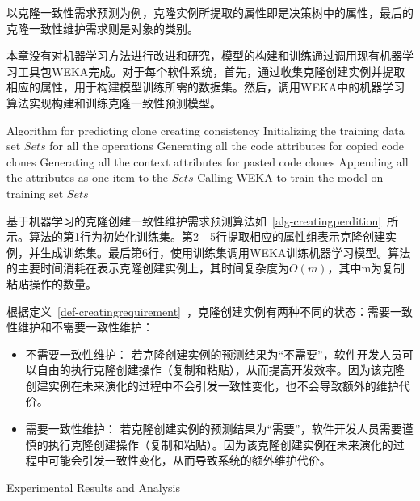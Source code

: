 以克隆一致性需求预测为例，克隆实例所提取的属性即是决策树中的属性，最后的克隆一致性维护需求则是对象的类别。

本章没有对机器学习方法进行改进和研究，模型的构建和训练通过调用现有机器学习工具包WEKA完成。对于每个软件系统，首先，通过收集克隆创建实例并提取相应的属性，用于构建模型训练所需的数据集。然后，调用WEKA中的机器学习算法实现构建和训练克隆一致性预测模型。

\vspace{1em}
\begin{minipage}{0.8\textwidth}
\centering
\begin{algorithm}[H]
 {Algorithm for predicting clone creating consistency}
\label{alg-creatingperdition}
Initializing the training data set $Sets$ for all the operations\; 
{ 
Generating all the code attributes for copied code clones\;
Generating all the context attributes for pasted code clones\;
Appending all the attributes as one item to the $Sets$\;
}
Calling WEKA to train the model on training set $Sets$\;
\end{algorithm}
\end{minipage}
\vspace{1em}

基于机器学习的克隆创建一致性维护需求预测算法如~\ref{alg-creatingperdition}~所示。算法的第1行为初始化训练集。第2 - 5行提取相应的属性组表示克隆创建实例，并生成训练集。最后第6行，使用训练集调用WEKA训练机器学习模型。算法的主要时间消耗在表示克隆创建实例上，其时间复杂度为$O(m)$，其中m为复制粘贴操作的数量。


根据定义~\ref{def-creatingrequirement}~，克隆创建实例有两种不同的状态：需要一致性维护和不需要一致性维护：
\begin{itemize}
\item 
不需要一致性维护：
若克隆创建实例的预测结果为“不需要”，软件开发人员可以自由的执行克隆创建操作（复制和粘贴），从而提高开发效率。因为该克隆创建实例在未来演化的过程中不会引发一致性变化，也不会导致额外的维护代价。
\item
需要一致性维护：
若克隆创建实例的预测结果为“需要”，软件开发人员需要谨慎的执行克隆创建操作（复制和粘贴）。因为该克隆创建实例在未来演化的过程中可能会引发一致性变化，从而导致系统的额外维护代价。
\end{itemize}

{Experimental Results and Analysis}

